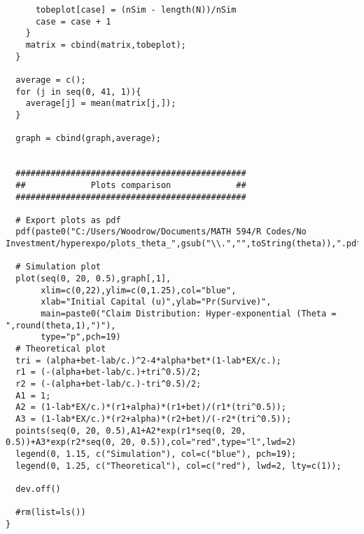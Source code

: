 \documentclass[12pt]{article}
\begin{document}
\begin{lstlisting}
      tobeplot[case] = (nSim - length(N))/nSim
      case = case + 1
    }
    matrix = cbind(matrix,tobeplot);
  }
  
  average = c();
  for (j in seq(0, 41, 1)){
    average[j] = mean(matrix[j,]);
  }
  
  graph = cbind(graph,average);
  
  
  ##############################################
  ##             Plots comparison             ##
  ##############################################
  
  # Export plots as pdf
  pdf(paste0("C:/Users/Woodrow/Documents/MATH 594/R Codes/No Investment/hyperexpo/plots_theta_",gsub("\\.","",toString(theta)),".pdf"))
  
  # Simulation plot
  plot(seq(0, 20, 0.5),graph[,1],
       xlim=c(0,22),ylim=c(0,1.25),col="blue",
       xlab="Initial Capital (u)",ylab="Pr(Survive)",
       main=paste0("Claim Distribution: Hyper-exponential (Theta = ",round(theta,1),")"),
       type="p",pch=19)
  # Theoretical plot
  tri = (alpha+bet-lab/c.)^2-4*alpha*bet*(1-lab*EX/c.);
  r1 = (-(alpha+bet-lab/c.)+tri^0.5)/2;
  r2 = (-(alpha+bet-lab/c.)-tri^0.5)/2;
  A1 = 1;
  A2 = (1-lab*EX/c.)*(r1+alpha)*(r1+bet)/(r1*(tri^0.5));
  A3 = (1-lab*EX/c.)*(r2+alpha)*(r2+bet)/(-r2*(tri^0.5));
  points(seq(0, 20, 0.5),A1+A2*exp(r1*seq(0, 20, 0.5))+A3*exp(r2*seq(0, 20, 0.5)),col="red",type="l",lwd=2)
  legend(0, 1.15, c("Simulation"), col=c("blue"), pch=19);
  legend(0, 1.25, c("Theoretical"), col=c("red"), lwd=2, lty=c(1));
  
  dev.off()
  
  #rm(list=ls())
}
\end{lstlisting}
\end{document}
